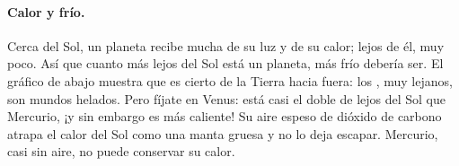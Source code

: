 \paragraph{Calor y frío.} Cerca del Sol, un planeta recibe mucha de su luz
y de su calor; lejos de él, muy poco. Así que cuanto más lejos del Sol está
un planeta, más frío debería ser. El gráfico de abajo muestra que es cierto
de la Tierra hacia fuera: los , muy lejanos, son mundos
helados. Pero fíjate en Venus: está casi el doble de lejos del Sol que
Mercurio, ¡y sin embargo es más caliente! Su aire espeso de dióxido de
carbono atrapa el calor del Sol como una manta gruesa y no lo deja
escapar. Mercurio, casi sin aire, no puede conservar su calor.

